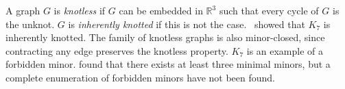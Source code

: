 A graph $G$ is \textit{knotless} if $G$ can be embedded in $\mathbb{R}^3$ such that every cycle of $G$ is the unknot. $G$ is \textit{inherently knotted} if this is not the case.\ \textcite{conwayKnotsLinksSpatial1983} showed that $K_7$ is inherently knotted. The family of knotless graphs is also minor-closed, since contracting any edge preserves the knotless property. $K_7$ is an example of a forbidden minor. \textcite{conwayKnotsLinksSpatial1983,foisyNewlyRecognizedIntrinsically2003,foisyIntrinsicallyKnottedGraphs2002} found that there exists at least three minimal minors, but a complete enumeration of forbidden minors have not been found. 

